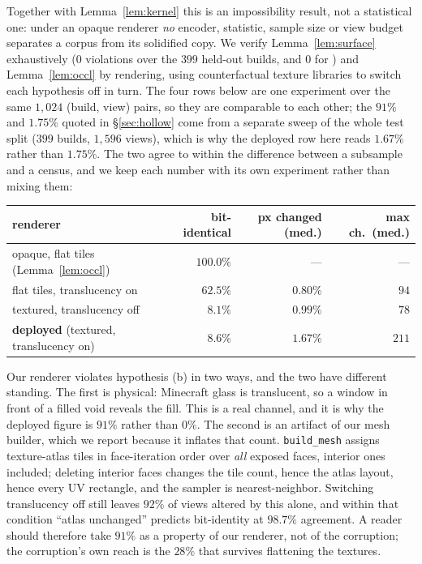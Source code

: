 Together with Lemma~\ref{lem:kernel} this is an impossibility result, not a
statistical one: under an opaque renderer \emph{no} encoder, statistic, sample
size or view budget separates a corpus from its solidified copy. We verify
Lemma~\ref{lem:surface} exhaustively ($0$ violations over the $399$ held-out
builds, and $0$ for \hollow{}) and Lemma~\ref{lem:occl} by rendering, using
counterfactual texture libraries to switch each hypothesis off in turn. The four
rows below are one experiment over the same $1{,}024$ (build, view) pairs, so
they are comparable to each other; the $91\%$ and $1.75\%$ quoted in
\S\ref{sec:hollow} come from a separate sweep of the whole test split
($399$ builds, $1{,}596$ views), which is why the deployed row here reads
$1.67\%$ rather than $1.75\%$. The two agree to within the difference between a
subsample and a census, and we keep each number with its own experiment rather
than mixing them:

\begin{center}\small
\begin{tabular}{lrrr}
\toprule
renderer & bit-identical & px changed (med.) & max ch.\ (med.) \\
\midrule
opaque, flat tiles (Lemma~\ref{lem:occl}) & $\mathbf{100.0\%}$ & --- & --- \\
flat tiles, translucency on & $62.5\%$ & $0.80\%$ & $94$ \\
textured, translucency off & $8.1\%$ & $0.99\%$ & $78$ \\
\textbf{deployed} (textured, translucency on) & $8.6\%$ & $1.67\%$ & $211$ \\
\bottomrule
\end{tabular}
\end{center}

Our renderer violates hypothesis (b) in two ways, and the two have different
standing. The first is physical: Minecraft glass is translucent, so a
window in front of a filled void reveals the fill. This is a real channel, and
it is why the deployed figure is $91\%$ rather than $0\%$. The second is an
artifact of our mesh builder, which we report because it inflates that count.
\texttt{build\_mesh} assigns texture-atlas tiles in face-iteration order over
\emph{all} exposed faces, interior ones included; deleting interior faces
changes the tile count, hence the atlas layout, hence every UV rectangle, and
the sampler is nearest-neighbor. Switching translucency off still leaves $92\%$
of views altered by this alone, and within that condition ``atlas unchanged''
predicts bit-identity at $98.7\%$ agreement. A reader should therefore take
$91\%$ as a property of our renderer, not of the corruption; the corruption's
own reach is the $28\%$ that survives flattening the textures.

